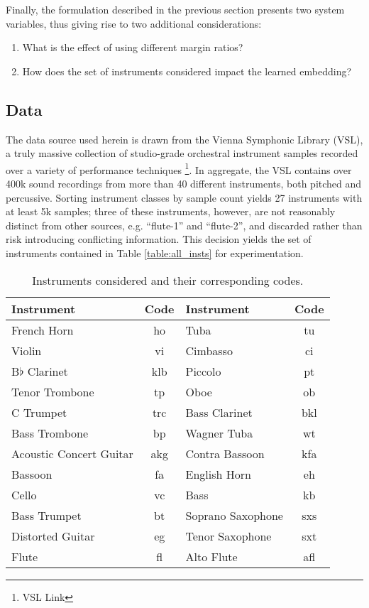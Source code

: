 Finally, the formulation described in the previous section presents two system variables, thus giving rise to two additional considerations:

\begin{enumerate}
\item What is the effect of using different margin ratios?
\item How does the set of instruments considered impact the learned embedding?
\end{enumerate}


\subsection{Data}
The data source used herein is drawn from the Vienna Symphonic Library (VSL), a truly massive collection of studio-grade orchestral instrument samples recorded over a variety of performance techniques \footnote{VSL Link}.
In aggregate, the VSL contains over 400k sound recordings from more than 40 different instruments, both pitched and percussive.
Sorting instrument classes by sample count yields 27 instruments with at least 5k samples; three of these instruments, however, are not reasonably distinct from other sources, e.g. ``flute-1'' and ``flute-2'', and discarded rather than risk introducing conflicting information.
This decision yields the set of instruments contained in Table \ref{table:all_insts} for experimentation.


\begin{table*}[h]
\begin{center}
\caption{Instruments considered and their corresponding codes.}
\begin{tabular}{l | c || l | c}
Instrument & Code & Instrument & Code \\
\hline
French Horn & ho & Tuba & tu\\
Violin & vi & Cimbasso & ci \\
B$\flat$ Clarinet & klb & Piccolo & pt \\
Tenor Trombone & tp & Oboe & ob \\
C Trumpet & trc & Bass Clarinet & bkl \\
Bass Trombone & bp & Wagner Tuba & wt \\
Acoustic Concert Guitar & akg & Contra Bassoon & kfa \\
Bassoon & fa & English Horn & eh \\
Cello & vc & Bass & kb \\
Bass Trumpet & bt & Soprano Saxophone & sxs \\
Distorted Guitar & eg & Tenor Saxophone & sxt \\
Flute & fl & Alto Flute & afl \\
\hline
\end{tabular}
\label{tab:things}
\end{center}
\end{table*}



